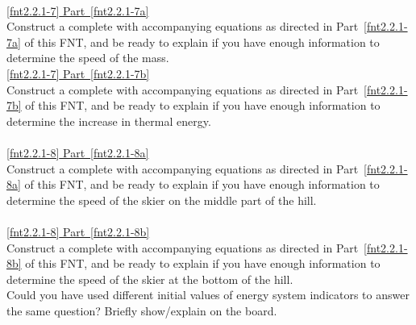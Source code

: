 \noindent{}\\

\noindent\hyperref[fnt2.2.1-7a]{\ref*{fnt2.2.1-7} Part~\ref*{fnt2.2.1-7a}}\\

\noindent Construct a complete \EnergyDiagram{} with accompanying equations as directed in Part~\eqref{fnt2.2.1-7a} of this FNT, and be ready to explain if you have enough information to determine the speed of the mass.\\

\noindent\hyperref[fnt2.2.1-7b]{\ref*{fnt2.2.1-7} Part~\ref*{fnt2.2.1-7b}}\\

\noindent Construct a complete \EnergyDiagram{} with accompanying equations as directed in Part~\eqref{fnt2.2.1-7b} of this FNT, and be ready to explain if you have enough information to determine the increase in thermal energy.\\
 
\noindent{}\\

\noindent\hyperref[fnt2.2.1-8a]{\ref*{fnt2.2.1-8} Part~\ref*{fnt2.2.1-8a}}\\

\noindent Construct a complete \EnergyDiagram{} with accompanying equations as directed in Part~\ref*{fnt2.2.1-8a} of this FNT, and be ready to explain if you have enough information to determine the speed of the skier on the middle part of the hill.\\

\noindent{}\\

\noindent\hyperref[fnt2.2.1-8b]{\ref*{fnt2.2.1-8} Part~\ref*{fnt2.2.1-8b}}\\

\noindent Construct a complete \EnergyDiagram{} with accompanying equations as directed in Part~\eqref{fnt2.2.1-8b} of this FNT, and be ready to explain if you have enough information to determine the speed of the skier at the bottom of the hill.\\

\noindent Could you have used different initial values of energy system indicators to answer the same question? Briefly show/explain on the board.\\

\noindent{}\\


